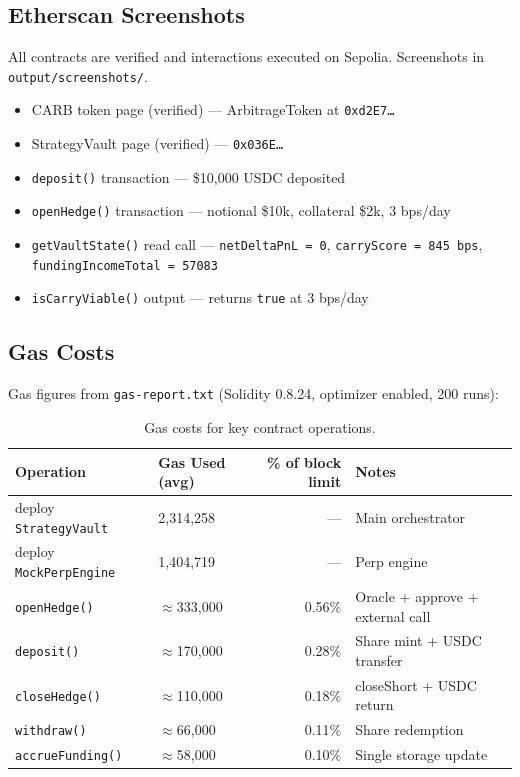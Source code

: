 \documentclass[11pt,a4paper]{article}
\begin{document}
\subsection{Etherscan Screenshots}

All contracts are verified and interactions executed on Sepolia. Screenshots in \texttt{output/screenshots/}.

\begin{itemize}
    \item[$\checkmark$] CARB token page (verified) --- ArbitrageToken at \texttt{0xd2E7\ldots}
    \item[$\checkmark$] StrategyVault page (verified) --- \texttt{0x036E\ldots}
    \item[$\checkmark$] \texttt{deposit()} transaction --- \$10,000 USDC deposited
    \item[$\checkmark$] \texttt{openHedge()} transaction --- notional \$10k, collateral \$2k, 3 bps/day
    \item[$\checkmark$] \texttt{getVaultState()} read call --- \texttt{netDeltaPnL = 0}, \texttt{carryScore = 845 bps}, \texttt{fundingIncomeTotal = 57083}
    \item[$\checkmark$] \texttt{isCarryViable()} output --- returns \texttt{true} at 3 bps/day
\end{itemize}

\subsection{Gas Costs}

Gas figures from \texttt{gas-report.txt} (Solidity 0.8.24, optimizer enabled, 200 runs):

\begin{table}[h!]
\centering
\caption{Gas costs for key contract operations.}
\begin{tabular}{@{}llrl@{}}
\toprule
\textbf{Operation} & \textbf{Gas Used (avg)} & \textbf{\% of block limit} & \textbf{Notes} \\
\midrule
deploy \texttt{StrategyVault}  & 2,314,258 & ---   & Main orchestrator \\
deploy \texttt{MockPerpEngine} & 1,404,719 & ---   & Perp engine \\
\texttt{openHedge()}           & $\approx$333,000 & 0.56\% & Oracle + approve + external call \\
\texttt{deposit()}             & $\approx$170,000 & 0.28\% & Share mint + USDC transfer \\
\texttt{closeHedge()}          & $\approx$110,000 & 0.18\% & closeShort + USDC return \\
\texttt{withdraw()}            & $\approx$66,000  & 0.11\% & Share redemption \\
\texttt{accrueFunding()}       & $\approx$58,000  & 0.10\% & Single storage update \\
\bottomrule
\end{tabular}
\end{table}
\end{document}
